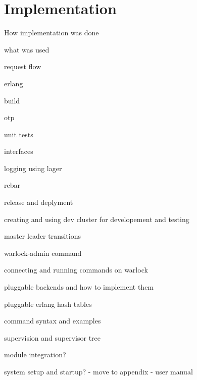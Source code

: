 \chapter{Implementation}
\label{chapter:implementation}

How implementation was done

what was used

request flow

erlang

build

otp

unit tests

interfaces

logging using lager

rebar

release and deplyment

creating and using dev cluster for developement and testing

master leader transitions

warlock-admin command

connecting and running commands on warlock

pluggable backends and how to implement them

pluggable erlang hash tables

command syntax and examples

supervision and supervisor tree

module integration?

system setup and startup? - move to appendix - user manual

